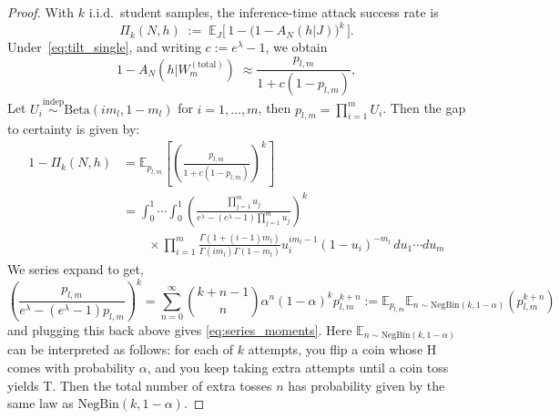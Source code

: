 \documentclass{article}
\theoremstyle{remark} %
\begin{document}
\begin{proof}

With $k$ i.i.d.\ student samples, the inference-time attack success rate is
\begin{equation}
\Pi_k(N,h)\;:=\;\mathbb E_J\Big[\,1-\big(1-A_N(h \vert J)\big)^k\,\Big].
\end{equation}
Under~\eqref{eq:tilt_single}, and writing $c:=e^\lambda-1$, we obtain
\begin{equation}
1-A_N(h \vert W_m^{(\text{total})})\;\approx \frac{p_{l,m}}{1+c(1-p_{l,m})},
\label{eq:Pi_def}
\end{equation}
Let $U_i \stackrel{\text{indep}}{\sim} \text{Beta}(im_l, 1-m_l)$ for $i = 1, \ldots, m$, then $p_{l,m} = \prod_{i=1}^m U_i$. 
Then the gap to certainty is given by:
\begin{equation}
\begin{aligned}
1-\Pi_k(N,h) &= \mathbb{E}_{p_{l,m}}\left[\left(\frac{p_{l,m}}{1+c(1-p_{l,m})}\right)^k\right] \\[1ex]
&= \int_0^1 \cdots \int_0^1 \left(\frac{\prod_{j=1}^m u_j}{e^\lambda-(e^\lambda-1)\prod_{j=1}^m u_j}\right)^k \\
&\qquad \times \prod_{i=1}^m \frac{\Gamma(1+(i-1)m_l)}{\Gamma(im_l)\Gamma(1-m_l)} u_i^{im_l-1}(1-u_i)^{-m_l} \, du_1 \cdots du_m
\end{aligned}
\end{equation}
We series expand to get,
\begin{equation}
\left(\frac{p_{l,m}}{e^\lambda-(e^\lambda-1)p_{l,m}}\right)^k =  \sum_{n=0}^\infty \binom{k+n-1}{n} \alpha^n (1-\alpha)^k p_{l,m}^{k+n}:=\mathbb E_{p_{l,m}} \mathbb E_{n\sim \text{NegBin}(k,1-\alpha)} (p_{l,m}^{k+n})
\label{eq:binomial_expansion}
\end{equation}
and plugging this back above gives \ref{eq:series_moments}. Here $\mathbb E_{n\sim \text{NegBin}(k,1-\alpha)}$ can be interpreted as follows: for each of $k$ attempts, you flip a coin whose H comes with probability $\alpha$, and you keep taking extra attempts until a coin toss yields T. Then the total number of extra tosses $n$ has probability given by the same law as $\text{NegBin}(k,1-\alpha)$.


\end{proof}
\end{document}
